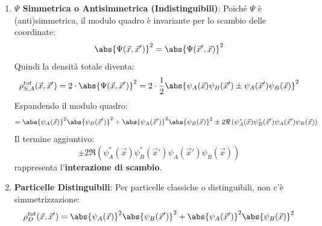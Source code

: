 \begin{enumerate}
    \item \textbf{\(\Psi\) Simmetrica o Antisimmetrica (Indistinguibili)}:
    Poiché \(\Psi\) è (anti)simmetrica, il modulo quadro è invariante per lo scambio delle coordinate:
    \begin{equation}
        \abs{\Psi(\vec{x}, \vec{x}')}^2 = \abs{\Psi(\vec{x}', \vec{x})}^2
    \end{equation}
    Quindi la densità totale diventa:
    \[
        \rho_{S,A}^{tot}(\vec{x}, \vec{x}') = 2 \cdot \abs{\Psi(\vec{x}, \vec{x}')}^2 = 2 \cdot \frac{1}{2} \abs{\psi_A(\vec{x})\psi_B(\vec{x}') \pm \psi_A(\vec{x}')\psi_B(\vec{x})}^2
    \]
    Espandendo il modulo quadro:
    \[
        = \abs{\psi_A(\vec{x})}^2 \abs{\psi_B(\vec{x}')}^2 + \abs{\psi_A(\vec{x}')}^2 \abs{\psi_B(\vec{x})}^2 \pm 2 \Re\left( \psi_A^*(\vec{x})\psi_B^*(\vec{x}')\psi_A(\vec{x}')\psi_B(\vec{x}) \right)
    \]
    Il termine aggiuntivo:
    \begin{equation}
        \pm 2 \Re\left( \psi_A^*(\vec{x})\psi_B^*(\vec{x}')\psi_A(\vec{x}')\psi_B(\vec{x}) \right)
    \end{equation}
    rappresenta l'\textbf{interazione di scambio}.

    \item \textbf{Particelle Distinguibili}:
    Per particelle classiche o distinguibili, non c'è simmetrizzazione:
    \begin{equation}
        \rho_D^{tot}(\vec{x}, \vec{x}') = \abs{\psi_A(\vec{x})}^2 \abs{\psi_B(\vec{x}')}^2 + \abs{\psi_A(\vec{x}')}^2 \abs{\psi_B(\vec{x})}^2
    \end{equation}
\end{enumerate}

